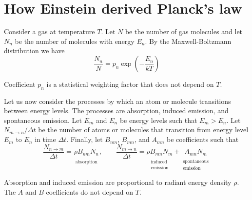 \documentclass[12pt]{article}
\begin{document}
\newcommand\BNM{B_{nm}} %
\newcommand\BMN{B_{mn}} %
\newcommand\AMN{A_{mn}} %
\newcommand\RHO{\rho}

\newcommand\ABSORPTION{\substack{\\[1ex] \text{absorption}}}
\newcommand\INDUCED{\substack{\\[1ex] \text{induced}\\ \text{emission}}}
\newcommand\SPONTANEOUS{\substack{\\[1ex] \text{spontaneous}\\ \text{emission}}}

\section*{How Einstein derived Planck's law}


Consider a gas at temperature $T$.
Let $N$ be the number of gas molecules
and let $N_n$ be the number of molecules with energy $E_n$.
By the Maxwell-Boltzmann distribution we have
\begin{equation*}
\frac{N_n}{N}=p_n\exp\left(-\frac{E_n}{kT}\right)
\tag{1}
\end{equation*}

Coefficient $p_n$ is a statistical weighting factor that does not depend on $T$.

\bigskip
Let us now consider the processes by which an atom or molecule transitions between energy levels.
The processes are absorption, induced emission, and spontaneous emission.
Let $E_m$ and $E_n$ be energy levels such that $E_m>E_n$.
Let $N_{m\rightarrow n}/\Delta t$ be the number of atoms or molecules that transition from energy level $E_m$ to $E_n$ in time $\Delta t$.
Finally, let $\BNM$, $\BMN$, and $\AMN$ be coefficients such that
\begin{equation*}
\frac{N_{n\rightarrow m}}{\Delta t}
=\underset{\ABSORPTION}{\RHO\BNM N_n},
\qquad
\frac{N_{m\rightarrow n}}{\Delta t}
=\underset{\INDUCED}{\RHO\BMN N_m}
+
\underset{\SPONTANEOUS}{\AMN N_m}
\end{equation*}

Absorption and induced emission are proportional to radiant energy density $\rho$.
The $A$ and $B$ coefficients do not depend on $T$.
\end{document}

